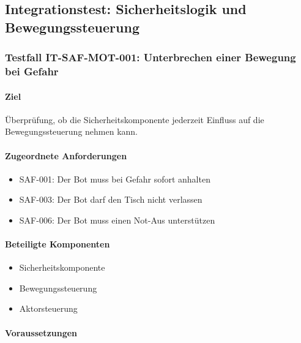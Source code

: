 \documentclass[
  a4paper,
  12pt,
  DIV=12,        %
  parskip=half,  %
  headings=small %
]{scrartcl}
\theoremstyle{definition}
\providecommand{\tightlist}{%
  \setlength{\itemsep}{0pt}\setlength{\parskip}{0pt}}
\theoremstyle{definition}
\begin{document}
\subsection{Integrationstest: Sicherheitslogik und
Bewegungssteuerung}\label{integrationstest-sicherheitslogik-und-bewegungssteuerung}

\subsubsection{Testfall IT-SAF-MOT-001: Unterbrechen einer Bewegung bei
Gefahr}\label{testfall-it-saf-mot-001-unterbrechen-einer-bewegung-bei-gefahr}

\paragraph{Ziel}\label{ziel-12}

Überprüfung, ob die Sicherheitskomponente jederzeit Einfluss auf die
Bewegungssteuerung nehmen kann.

\paragraph{Zugeordnete
Anforderungen}\label{zugeordnete-anforderungen-12}

\begin{itemize}
\tightlist
\item
  SAF-001: Der Bot muss bei Gefahr sofort anhalten
\item
  SAF-003: Der Bot darf den Tisch nicht verlassen
\item
  SAF-006: Der Bot muss einen Not-Aus unterstützen
\end{itemize}

\paragraph{Beteiligte Komponenten}\label{beteiligte-komponenten-3}

\begin{itemize}
\tightlist
\item
  Sicherheitskomponente
\item
  Bewegungssteuerung
\item
  Aktorsteuerung
\end{itemize}

\paragraph{Voraussetzungen}\label{voraussetzungen-12}
\end{document}
